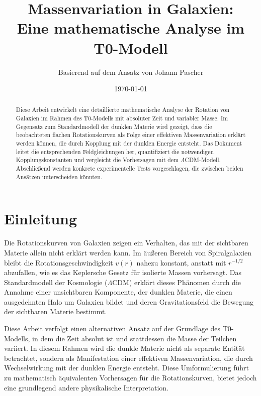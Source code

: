 \documentclass[a4paper,12pt]{article}
\begin{document}
	
	\title{Massenvariation in Galaxien: \\Eine mathematische Analyse im T0-Modell}
	\author{Basierend auf dem Ansatz von Johann Pascher}
	\date{\today}
	\maketitle
	
	\begin{abstract}
		Diese Arbeit entwickelt eine detaillierte mathematische Analyse der Rotation von Galaxien im Rahmen des T0-Modells mit absoluter Zeit und variabler Masse. Im Gegensatz zum Standardmodell der dunklen Materie wird gezeigt, dass die beobachteten flachen Rotationskurven als Folge einer effektiven Massenvariation erklärt werden können, die durch Kopplung mit der dunklen Energie entsteht. Das Dokument leitet die entsprechenden Feldgleichungen her, quantifiziert die notwendigen Kopplungskonstanten und vergleicht die Vorhersagen mit dem $\Lambda$CDM-Modell. Abschließend werden konkrete experimentelle Tests vorgeschlagen, die zwischen beiden Ansätzen unterscheiden könnten.
	\end{abstract}
	
	\tableofcontents
	\newpage
	
	\section{Einleitung}
	
	Die Rotationskurven von Galaxien zeigen ein Verhalten, das mit der sichtbaren Materie allein nicht erklärt werden kann. Im äußeren Bereich von Spiralgalaxien bleibt die Rotationsgeschwindigkeit $v(r)$ nahezu konstant, anstatt mit $r^{-1/2}$ abzufallen, wie es das Keplersche Gesetz für isolierte Massen vorhersagt. Das Standardmodell der Kosmologie ($\Lambda$CDM) erklärt dieses Phänomen durch die Annahme einer unsichtbaren Komponente, der dunklen Materie, die einen ausgedehnten Halo um Galaxien bildet und deren Gravitationsfeld die Bewegung der sichtbaren Materie bestimmt.
	
	Diese Arbeit verfolgt einen alternativen Ansatz auf der Grundlage des T0-Modells, in dem die Zeit absolut ist und stattdessen die Masse der Teilchen variiert. In diesem Rahmen wird die dunkle Materie nicht als separate Entität betrachtet, sondern als Manifestation einer effektiven Massenvariation, die durch Wechselwirkung mit der dunklen Energie entsteht. Diese Umformulierung führt zu mathematisch äquivalenten Vorhersagen für die Rotationskurven, bietet jedoch eine grundlegend andere physikalische Interpretation.
	
\end{document}
